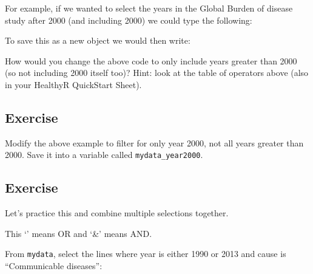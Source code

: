 \documentclass[]{book}
\makeatletter
\newenvironment{Shaded}{\begin{snugshade}}{\end{snugshade}}
\newcommand{\KeywordTok}[1]{\textcolor[rgb]{0.13,0.29,0.53}{\textbf{#1}}}
\newcommand{\DecValTok}[1]{\textcolor[rgb]{0.00,0.00,0.81}{#1}}
\newcommand{\StringTok}[1]{\textcolor[rgb]{0.31,0.60,0.02}{#1}}
\newcommand{\CommentTok}[1]{\textcolor[rgb]{0.56,0.35,0.01}{\textit{#1}}}
\newcommand{\OperatorTok}[1]{\textcolor[rgb]{0.81,0.36,0.00}{\textbf{#1}}}
\newcommand{\NormalTok}[1]{#1}
\newenvironment{kframe}{%
\medskip{}
\setlength{\fboxsep}{.8em}
 \def\at@end@of@kframe{}%
 \ifinner\ifhmode%
  \def\at@end@of@kframe{\end{minipage}}%
  \begin{minipage}{\columnwidth}%
 \fi\fi%
 \def\FrameCommand##1{\hskip\@totalleftmargin \hskip-\fboxsep
 \colorbox{shadecolor}{##1}\hskip-\fboxsep
     \hskip-\linewidth \hskip-\@totalleftmargin \hskip\columnwidth}%
 \MakeFramed {\advance\hsize-\width
   \@totalleftmargin\z@ \linewidth\hsize
   \@setminipage}}%
 {\par\unskip\endMakeFramed%
 \at@end@of@kframe}
\renewenvironment{Shaded}{\begin{kframe}}{\end{kframe}}
\theoremstyle{definition}
\theoremstyle{definition}
\theoremstyle{definition}
\theoremstyle{remark}
\makeatother
\begin{document}
For example, if we wanted to select the years in the Global Burden of
disease study after 2000 (and including 2000) we could type the
following:

\begin{Shaded}
\end{Shaded}

To save this as a new object we would then write:

\begin{Shaded}
\end{Shaded}

How would you change the above code to only include years greater than
2000 (so not including 2000 itself too)? Hint: look at the table of
operators above (also in your HealthyR QuickStart Sheet).

\subsection{Exercise}\label{exercise-6}

Modify the above example to filter for only year 2000, not all years
greater than 2000. Save it into a variable called
\texttt{mydata\_year2000}.

\subsection{Exercise}\label{exercise-7}

Let's practice this and combine multiple selections together.

This `\textbar{}' means OR and `\&' means AND.

From \texttt{mydata}, select the lines where year is either 1990 or 2013
and cause is ``Communicable diseases'':
\end{document}
